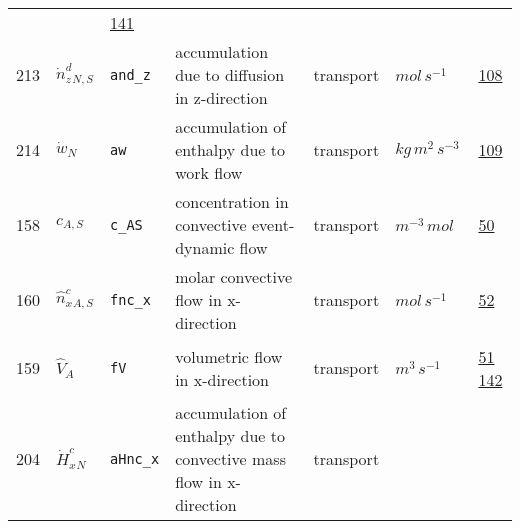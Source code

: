 \begin{longtable}{|p{1cm}|p{2.5cm}|p{4.5cm}|p{8cm}|p{3.0cm}|p{3cm}|p{1cm}|}
             & $  $
             &                 \hyperlink{"e:141"}{ 141 }
                 \\
            213
             & \hypertarget{"v:213"}{ $ {{\dot{n}^d_z}}{_{N, S}} $}
             & \verb|and_z|
             & accumulation due to diffusion in z-direction
             & \begin{lay}transport \end{lay}
             & $ mol \,s^{-1} \, $
             &                 \hyperlink{"e:108"}{ 108 }
                 \\
            214
             & \hypertarget{"v:214"}{ $ {{\dot{w}}}{_{N}} $}
             & \verb|aw|
             & accumulation of enthalpy due to work flow
             & \begin{lay}transport \end{lay}
             & $ kg \,m^{2} \,s^{-3} \, $
             &                 \hyperlink{"e:109"}{ 109 }
                 \\
            158
             & \hypertarget{"v:158"}{ $ {c}{_{A, S}} $}
             & \verb|c_AS|
             & concentration in convective event-dynamic flow
             & \begin{lay}transport \end{lay}
             & $ m^{-3} \,mol \, $
             &                 \hyperlink{"e:50"}{ 50 }
                 \\
            160
             & \hypertarget{"v:160"}{ $ {{\hat{n}^c_x}}{_{A, S}} $}
             & \verb|fnc_x|
             & molar convective flow in x-direction
             & \begin{lay}transport \end{lay}
             & $ mol \,s^{-1} \, $
             &                 \hyperlink{"e:52"}{ 52 }
                 \\
            159
             & \hypertarget{"v:159"}{ $ {{\hat{V}}}{_{A}} $}
             & \verb|fV|
             & volumetric flow in x-direction
             & \begin{lay}transport \end{lay}
             & $ m^{3} \,s^{-1} \, $
             &                 \hyperlink{"e:51"}{ 51 }
                                 \hyperlink{"e:142"}{ 142 }
                 \\
            204
             & \hypertarget{"v:204"}{ $ {{\dot{H}^c_x}}{_{N}} $}
             & \verb|aHnc_x|
             & accumulation of enthalpy due to convective mass flow in x-direction
             & \begin{lay}transport \end{lay}

\end{longtable}
